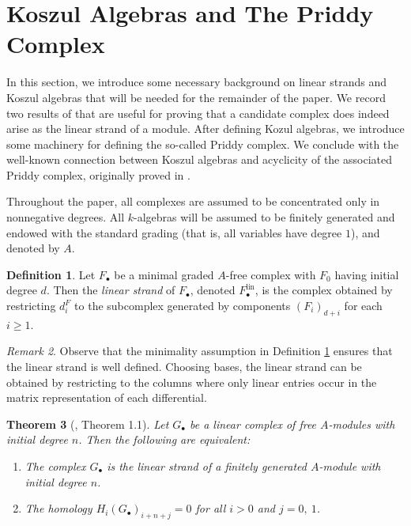 \documentclass[10pt]{amsart}
\newtheorem{theorem}{Theorem}[section]
\theoremstyle{definition}
\newtheorem{definition}[theorem]{Definition}
\theoremstyle{remark}
\newtheorem{remark}[theorem]{Remark}
\newtheorem{the context}[theorem]{The Context}
\numberwithin{equation}{theorem}
\numberwithin{equation}{section}
\renewcommand{\geq}{\geqslant}
\newcommand{\lin}{\operatorname{lin}}
\begin{document}
\section{Koszul Algebras and The Priddy Complex}\label{sec:background}

In this section, we introduce some necessary background on linear strands and Koszul algebras that will be needed for the remainder of the paper. We record two results of \cite{herzog2015linear} that are useful for proving that a candidate complex does indeed arise as the linear strand of a module. After defining Kozul algebras, we introduce some machinery for defining the so-called Priddy complex. We conclude with the well-known connection between Koszul algebras and acyclicity of the associated Priddy complex, originally proved in \cite{priddy1970koszul}.

Throughout the paper, all complexes are assumed to be concentrated only in nonnegative degrees. All $k$-algebras will be assumed to be finitely generated and endowed with the standard grading (that is, all variables have degree $1$), and denoted by $A$. 

\begin{definition}\label{def:linStrand}
Let $F_\bullet$ be a minimal graded $A$-free complex with $F_0$ having initial degree $d$. Then the \emph{linear strand} of $F_\bullet$, denoted $F_\bullet^{\lin}$, is the complex obtained by restricting $d_i^F$ to the subcomplex generated by components $(F_i)_{d+i}$ for each $i \geq 1$.
\end{definition}

\begin{remark}
Observe that the minimality assumption in Definition \ref{def:linStrand} ensures that the linear strand is well defined. Choosing bases, the linear strand can be obtained by restricting to the columns where only linear entries occur in the matrix representation of each differential.
\end{remark}

\begin{theorem}[\cite{herzog2015linear}, Theorem 1.1]\label{thm:linstrandequiv}
Let $G_\bullet$ be a linear complex of free $A$-modules with initial degree $n$. Then the following are equivalent:
\begin{enumerate}
    \item The complex $G_\bullet$ is the linear strand of a finitely generated $A$-module with initial degree $n$.
    \item The homology $H_i (G_\bullet)_{i+n+j} = 0$ for all $i>0$ and $j=0, \ 1$.
\end{enumerate}
\end{theorem}
\end{document}
